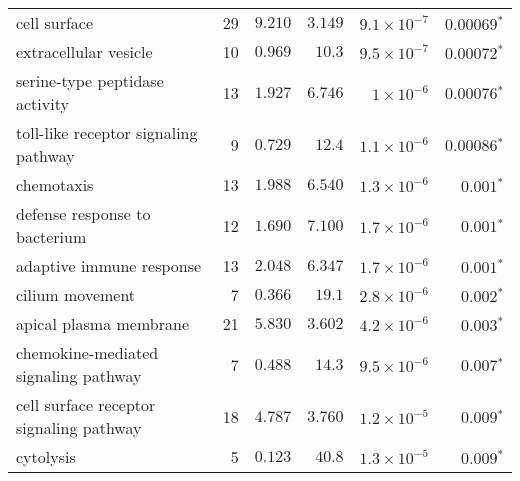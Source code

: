 \begin{longtable}{|l|r|r|r|r|r|}
    cell surface                                      & 29                      & $ 9.210$                & $ 3.149$   & $9.1\times 10^{-7}$  & $\bm{0.00069{^*}}$            \\
    extracellular vesicle                             & 10                      & $ 0.969$                & $  10.3$     & $9.5\times 10^{-7}$  & $\bm{0.00072{^*}}$            \\
    serine-type peptidase activity                    & 13                      & $ 1.927$                & $ 6.746$   & $ 1\times 10^{-6}$   & $\bm{0.00076{^*}}$            \\
    toll-like receptor signaling pathway              & 9                       & $ 0.729$                & $  12.4$     & $1.1\times 10^{-6}$  & $\bm{0.00086{^*}}$            \\
    chemotaxis                                        & 13                      & $ 1.988$                & $ 6.540$   & $1.3\times 10^{-6}$  & $\bm{ 0.001{^*}}$             \\
    defense response to bacterium                     & 12                      & $ 1.690$                & $ 7.100$   & $1.7\times 10^{-6}$  & $\bm{ 0.001{^*}}$             \\
    adaptive immune response                          & 13                      & $ 2.048$                & $ 6.347$   & $1.7\times 10^{-6}$  & $\bm{ 0.001{^*}}$             \\
    cilium movement                                   & 7                       & $ 0.366$                & $  19.1$     & $2.8\times 10^{-6}$  & $\bm{ 0.002{^*}}$             \\
    apical plasma membrane                            & 21                      & $ 5.830$                & $ 3.602$   & $4.2\times 10^{-6}$  & $\bm{ 0.003{^*}}$             \\
    chemokine-mediated signaling pathway              & 7                       & $ 0.488$                & $  14.3$     & $9.5\times 10^{-6}$  & $\bm{ 0.007{^*}}$             \\
    cell surface receptor signaling pathway           & 18                      & $ 4.787$                & $ 3.760$   & $1.2\times 10^{-5}$ & $\bm{ 0.009{^*}}$ \\
    cytolysis                                         & 5                       & $ 0.123$                & $  40.8$     & $1.3\times 10^{-5}$  & $\bm{ 0.009{^*}}$             \\

\end{longtable}
